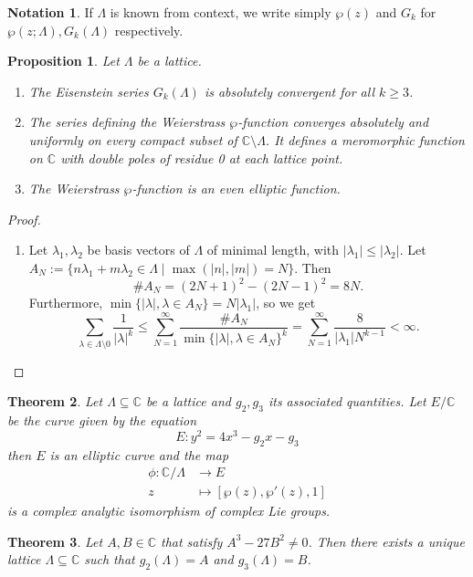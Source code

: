 \documentclass{article}
\newtheorem{theorem}{Theorem}[section]
\newtheorem{proposition}[theorem]{Proposition}
\theoremstyle{definition}
\newtheorem*{notation}{Notation}
\theoremstyle{remark}
\newcommand{\C}{\mathbb{C}}
\begin{document}
\begin{notation}
	If $\Lambda$ is known from context, we write simply
	$\wp(z)$ and $G_k$ for $\wp(z; \Lambda), G_k(\Lambda)$
	respectively.
\end{notation}

\begin{proposition}
	Let $\Lambda$ be a lattice.
	\begin{enumerate}
		\item	The Eisenstein series $G_k(\Lambda)$ is absolutely convergent
			for all $k \geq 3$.
		\item The series defining the Weierstrass $\wp$-function converges
			absolutely and uniformly on every compact subset of
			$\C\setminus\Lambda$. It defines a meromorphic function on $\C$ with 
			double poles of residue 0 at each lattice point.
		\item The Weierstrass $\wp$-function is an even elliptic function.
	\end{enumerate}
\end{proposition}

\begin{proof}
	\begin{enumerate}
	\item	Let $\lambda_1, \lambda_2$ be basis vectors of $\Lambda$
		of minimal length, with $|\lambda_1| \leq |\lambda_2|$.
		Let $A_N := \{n\lambda_1 + m\lambda_2 \in \Lambda \mid
		\max(|n|, |m|) = N\}$.
		Then 
		\begin{equation*}
			\#A_N = (2N + 1)^2 - (2N - 1)^2 = 8N.
		\end{equation*}
		Furthermore, $\min\{|\lambda|, \lambda \in A_N\} = N|\lambda_1|$, so we
		get
		\begin{equation*}
			\sum_{\lambda \in \Lambda\setminus 0}\frac{1}{|\lambda|^k}
			\leq \sum_{N=1}^\infty \frac{\#A_N}{\min\{|\lambda|, \lambda \in
			A_N\}^k}
			= \sum_{N=1}^{\infty} \frac{8}{|\lambda_1|N^{k-1}} < \infty.
		\end{equation*}

	\end{enumerate}
\end{proof}

\begin{theorem}
	Let $\Lambda \subseteq \C$ be a lattice
	and $g_2, g_3$ its associated quantities.
	Let $E/\C$ be the curve given by the equation
	\begin{equation*}
		E: y^2 = 4x^3 - g_2 x - g_3
	\end{equation*}
	then $E$ is an elliptic curve and the map
	\begin{align*}
		\phi: \C/\Lambda &\to E\\
		z &\mapsto [\wp(z), \wp'(z), 1]
	\end{align*}
	is a complex analytic isomorphism of complex Lie groups.
\end{theorem}

\begin{theorem}
	Let $A, B \in \C$ that satisfy $A^3 - 27B^2 \neq 0$.
	Then there exists a unique lattice
	$\Lambda \subseteq \C$ such that
	$g_2(\Lambda) = A$ and $g_3(\Lambda) = B$.
\end{theorem}
\end{document}
